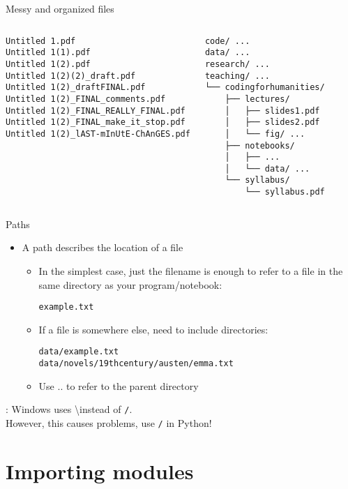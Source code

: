 \documentclass[aspectratio=169,usenames,dvipsnames]{beamer}
\begin{document}
\begin{frame}[fragile]{Messy and organized files}
\begin{columns}
\begin{verbatim}
Untitled 1.pdf
Untitled 1(1).pdf
Untitled 1(2).pdf
Untitled 1(2)(2)_draft.pdf
Untitled 1(2)_draftFINAL.pdf
Untitled 1(2)_FINAL_comments.pdf
Untitled 1(2)_FINAL_REALLY_FINAL.pdf
Untitled 1(2)_FINAL_make_it_stop.pdf
Untitled 1(2)_lAST-mInUtE-ChAnGES.pdf
\end{verbatim}
\pause
{}
\begin{verbatim}
code/ ...
data/ ...
research/ ...
teaching/ ...
└── codingforhumanities/
    ├── lectures/
    │   ├── slides1.pdf
    │   ├── slides2.pdf
    │   └── fig/ ...
    ├── notebooks/
    │   ├── ...
    │   └── data/ ...
    └── syllabus/
        └── syllabus.pdf
\end{verbatim}
\end{columns}
\end{frame}

\begin{frame}{Paths}
    \begin{itemize}
        \item A path describes the location of a file
		\begin{itemize}
        \item In the simplest case, just the filename is enough to
            refer to a file in the same directory as your program/notebook:

            \texttt{example.txt}

        \item If a file is somewhere else, need to include directories:

            \texttt{data/example.txt}\\
            \texttt{data/novels/19thcentury/austen/emma.txt}
		\item Use .. to refer to the parent directory
		\end{itemize}
    \end{itemize}
    : Windows uses \textbackslash instead of \texttt{/}. \\
        However, this causes problems, use \texttt{/} in Python!
\end{frame}


\section{Importing modules}
\frame{\tableofcontents[currentsection]}
\end{document}
